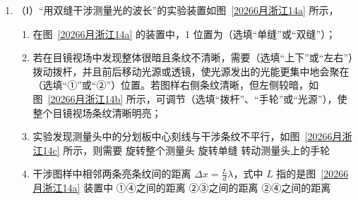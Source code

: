 \documentclass[\gkver]{gaokaozhenti}
\begin{document}
\begin{enumerate}
{C．电子和氢原子碰撞后，剩余动能共 4 种可能，分别是

无能量损失：$E_{k1}=12.8$ $\UeV$

激发到 $n=2$：$E_{k2}=12.8-10.2=2.6$ $\UeV$

激发氢到 $n=3$：$E_{k3}=12.8-12.09=0.71$ $\UeV$

激发氢到 $n=4$：$E_{k4}=12.8-12.75=0.05$ $\UeV$

共 4 个分立的荧光斑点，故 C 错误；

D．结合 $L=\frac{2d}{eU}E_{k}$ 计算各动能对应的水平位移：
\[ E_{k1}=12.8\mathrm{eV}\Rightarrow L_{1}=12.8\mathrm{cm} \]
\[ E_{k2}=2.6\mathrm{eV}\Rightarrow L_{2}=2.6\mathrm{cm} \]
\[ E_{k3}=0.71\mathrm{eV}\Rightarrow L_{3}=0.71\mathrm{cm} \]
\[ E_{k4}=0.05\mathrm{eV}\Rightarrow L_{4}=0.05\mathrm{cm} \]
因此相邻荧光斑点的最大间距为 10.2 $\Ucm$，故 D 正确。

故选 AD。
}

\item
（Ⅰ）“用双缝干涉测量光的波长”的实验装置如图~\ref{20266月浙江14a} 所示，
\begin{enumerate}
    \item
    在图~\ref{20266月浙江14a} 的装置中，1 位置为（选填“单缝”或“双缝”）；
    \item
    若在目镜视场中发现整体很暗且条纹不清晰，需要（选填“上下”或“左右”）拨动拨杆，并且前后移动光源或透镜，使光源发出的光能更集中地会聚在（选填“①”或“②”）位置。若图样右侧条纹清晰，但左侧较暗，如图~\ref{20266月浙江14b} 所示，可调节（选填“拨杆”、“手轮”或“光源”），使整个目镜视场条纹清晰明亮；
    \item
    实验发现测量头中的分划板中心刻线与干涉条纹不平行，如图~\ref{20266月浙江14c} 所示，则需要
    {旋转整个测量头}
    {旋转单缝}
    {转动测量头上的手轮}
    \item
    干涉图样中相邻两条亮条纹间的距离 $\Delta x=\frac{L}{d}\lambda$，式中 $L$ 指的是图~\ref{20266月浙江14a} 装置中
    {①④之间的距离}
    {②③之间的距离}
    {②④之间的距离}
\end{enumerate}


\end{enumerate}
\end{document}
